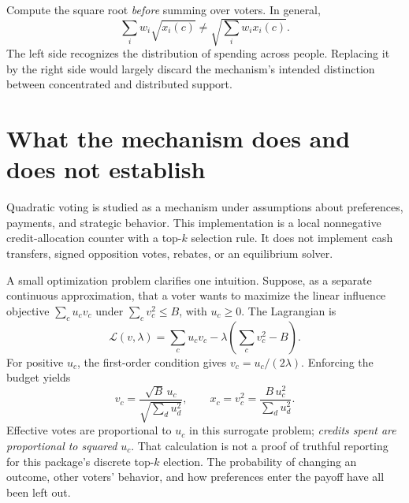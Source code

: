 Compute the square root \emph{before} summing over voters. In general,
\[
\sum_iw_i\sqrt{x_i(c)}\ne\sqrt{\sum_iw_i x_i(c)}.
\]
The left side recognizes the distribution of spending across people. Replacing it by the right side would largely discard the mechanism's intended distinction between concentrated and distributed support.

\begin{center}
\end{center}

\section{What the mechanism does and does not establish}
Quadratic voting is studied as a mechanism under assumptions about preferences, payments, and strategic behavior.\cite{quadratic} This implementation is a local nonnegative credit-allocation counter with a top-$k$ selection rule. It does not implement cash transfers, signed opposition votes, rebates, or an equilibrium solver.

A small optimization problem clarifies one intuition. Suppose, as a separate continuous approximation, that a voter wants to maximize the linear influence objective $\sum_c u_c v_c$ under $\sum_c v_c^2\leq B$, with $u_c\geq0$. The Lagrangian is
\[
\mathcal L(v,\lambda)=\sum_cu_cv_c-\lambda\left(\sum_cv_c^2-B\right).
\]
For positive $u_c$, the first-order condition gives $v_c=u_c/(2\lambda)$. Enforcing the budget yields
\[
v_c=\frac{\sqrt B\,u_c}{\sqrt{\sum_du_d^2}},\qquad
x_c=v_c^2=\frac{B\,u_c^2}{\sum_du_d^2}.
\]
Effective votes are proportional to $u_c$ in this surrogate problem; \emph{credits spent are proportional to squared} $u_c$. That calculation is not a proof of truthful reporting for this package's discrete top-$k$ election. The probability of changing an outcome, other voters' behavior, and how preferences enter the payoff have all been left out.

